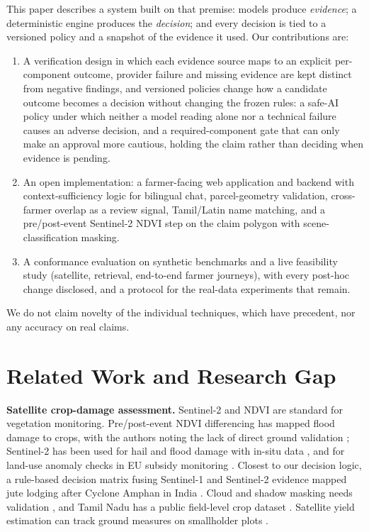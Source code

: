 \documentclass{ieeeaccess}
\begin{document}
This paper describes a system built on that premise: models produce \emph{evidence}; a deterministic engine produces the \emph{decision}; and every decision is tied to a versioned policy and a snapshot of the evidence it used. Our contributions are:
\begin{enumerate}
\item A verification design in which each evidence source maps to an explicit per-component outcome, provider failure and missing evidence are kept distinct from negative findings, and versioned policies change how a candidate outcome becomes a decision without changing the frozen rules: a safe-AI policy under which neither a model reading alone nor a technical failure causes an adverse decision, and a required-component gate that can only make an approval more cautious, holding the claim rather than deciding when evidence is pending.
\item An open implementation: a farmer-facing web application and backend with context-sufficiency logic for bilingual chat, parcel-geometry validation, cross-farmer overlap as a review signal, Tamil/Latin name matching, and a pre/post-event Sentinel-2 NDVI step on the claim polygon with scene-classification masking.
\item A conformance evaluation on synthetic benchmarks and a live feasibility study (satellite, retrieval, end-to-end farmer journeys), with every post-hoc change disclosed, and a protocol for the real-data experiments that remain.
\end{enumerate}
We do not claim novelty of the individual techniques, which have precedent, nor any accuracy on real claims.

\section{Related Work and Research Gap}\label{sec:gap}
\textbf{Satellite crop-damage assessment.} Sentinel-2 \cite{drusch2012} and NDVI \cite{tucker1979} are standard for vegetation monitoring. Pre/post-event NDVI differencing has mapped flood damage to crops, with the authors noting the lack of direct ground validation \cite{ursu2025}; Sentinel-2 has been used for hail \cite{ha2022} and flood damage with in-situ data \cite{bocchino2025}, and for land-use anomaly checks in EU subsidy monitoring \cite{kanjir2018}. Closest to our decision logic, a rule-based decision matrix fusing Sentinel-1 and Sentinel-2 evidence mapped jute lodging after Cyclone Amphan in India \cite{chakraborty2021}. Cloud and shadow masking needs validation \cite{baetens2019,raiyani2021,aybar2022}, and Tamil Nadu has a public field-level crop dataset \cite{sani2024}. Satellite yield estimation can track ground measures on smallholder plots \cite{lobell2020,burke2017}.
\end{document}
